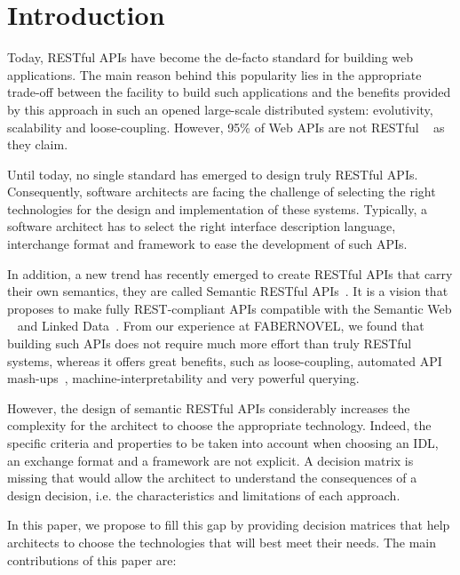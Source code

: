\section{Introduction}

\vspace*{-0.2cm}


Today, RESTful APIs \cite{FieldingThesis} have become the de-facto standard for building web applications. The main reason behind this popularity lies in the appropriate trade-off between the facility to build such applications and the benefits provided by this approach in such an opened large-scale distributed system: evolutivity, scalability and loose-coupling. However, 95\% of Web APIs are not RESTful ~\cite{10.1007/978-3-319-38791-8_2} as they claim.

Until today, no single standard has emerged to design truly RESTful APIs. Consequently, software architects are facing the challenge of selecting the right technologies for the design and implementation of these systems. Typically, a software architect has to select the right interface description language, interchange format and framework to ease the development of such APIs.

In addition, a new trend has recently emerged to create RESTful APIs that carry their own semantics, they are called Semantic RESTful APIs~\cite{7195633}. It is a vision that proposes to make fully REST-compliant APIs compatible with the Semantic Web ~\cite{TheSemanticWeb} and Linked Data~\cite{LinkedDataPrinciples}. From our experience at FABERNOVEL, we found that building such APIs does not require much more effort than truly RESTful systems, whereas it offers great benefits, such as loose-coupling, automated API mash-ups~\cite{benslimane2008services}, machine-interpretability and very powerful querying. 

However, the design of semantic RESTful APIs considerably increases the complexity for the architect to choose the appropriate technology. Indeed, the specific criteria and properties to be taken into account when choosing an IDL, an exchange format and a framework are not explicit. A decision matrix is missing that would allow the architect to understand the consequences of a design decision, i.e. the characteristics and limitations of each approach.
 
In this paper, we propose to fill this gap by providing decision matrices that help architects to choose the technologies that will best meet their needs. The main contributions of this paper are:

